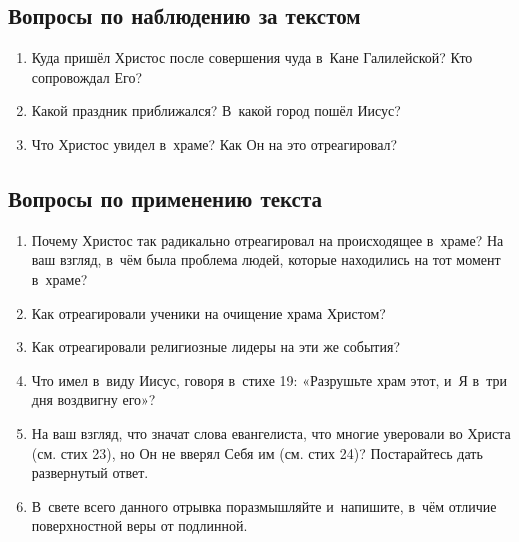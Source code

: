 \documentclass[a4paper,12pt]{article}
\begin{document}
\subsection*{Вопросы по наблюдению за текстом}
\begin{enumerate}
    \item Куда пришёл Христос после совершения чуда в~Кане Галилейской? Кто сопровождал Его? 
    
    \myline
    
    \myline
    \item Какой праздник приближался? В~какой город пошёл Иисус? 
    
    \myline
   
    \myline
    \item Что Христос увидел в~храме? Как Он на это отреагировал?
    
    \myline
    
    \myline
\end{enumerate}

\subsection*{Вопросы по применению текста} 
\begin{enumerate}
    \item Почему Христос так радикально отреагировал на происходящее в~храме? На ваш взгляд, в~чём была проблема людей, которые находились на тот момент в~храме? 
    
    \myline
    
    \myline
    \item Как отреагировали ученики на очищение храма Христом?
    
    \myline
    
    \myline
    \item Как отреагировали религиозные лидеры на эти же события? 
    
    \myline
    
    \myline
    \item Что имел в~виду Иисус, говоря в~стихе 19: «Разрушьте храм этот, и~Я в~три дня воздвигну его»? 
    
    \myline
    
    \myline
    \item На ваш взгляд, что значат слова евангелиста, что многие уверовали во Христа (см. стих 23), но Он не вверял Себя им (см. стих 24)? Постарайтесь дать развернутый ответ. 
    
    \myline
    
    \myline
    \item В~свете всего данного отрывка поразмышляйте и~напишите, в~чём отличие поверхностной веры от подлинной.
    
    \myline
    
    \myline
\end{enumerate}
\end{document}

